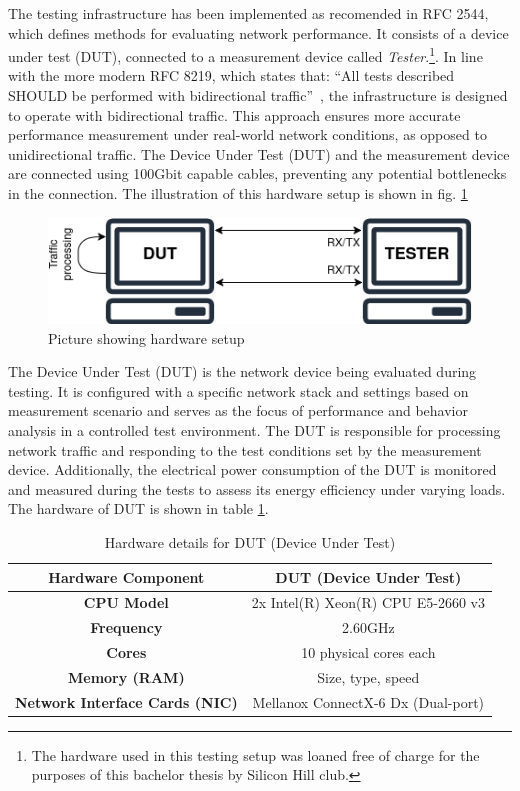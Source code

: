 The testing infrastructure has been implemented as recomended in RFC 2544, which defines methods for evaluating network performance. 
It consists of a device under test (DUT), connected to a measurement device called \textit{Tester}.\footnote{The hardware used in this testing setup was loaned free of charge for the purposes of this bachelor thesis by Silicon Hill club.}.
In line with the more modern RFC 8219, which states that: ``All tests described SHOULD be performed with bidirectional traffic''~\cite{RFC8219}, the infrastructure is designed to operate with bidirectional traffic. 
This approach ensures more accurate performance measurement under real-world network conditions, as opposed to unidirectional traffic.
The Device Under Test (DUT) and the measurement device are connected using 100Gbit capable cables, preventing any potential bottlenecks in the connection.
The illustration of this hardware setup is shown in fig. \ref{fig:hardware-setup}

\begin{figure}[!htbp]
    \centering
    \includegraphics[width=0.9\linewidth]{images/setup.png}
    \caption{Picture showing hardware setup}
    \label{fig:hardware-setup}
\end{figure}

The Device Under Test (DUT) is the network device being evaluated during testing. 
It is configured with a specific network stack and settings based on measurement scenario 
and serves as the focus of performance and behavior analysis in a controlled test environment. 
The DUT is responsible for processing network traffic and responding to the test conditions set by the measurement device.
Additionally, the electrical power consumption of the DUT is monitored and measured during the tests to assess its energy efficiency under varying loads.
The hardware of DUT is shown in table \ref{tab:hardware_dut}.

\begin{table}[h!]
\centering
\begin{tabular}{|c|c|}
\hline
\textbf{Hardware Component} & \textbf{DUT (Device Under Test)} \\
\hline
\textbf{CPU Model} & 2x Intel(R) Xeon(R) CPU E5-2660 v3 \\
\hline
\textbf{Frequency} & 2.60GHz \\
\hline
\textbf{Cores} & 10 physical cores each \\
\hline
\textbf{Memory (RAM)} & Size, type, speed \\
\hline
\textbf{Network Interface Cards (NIC)} & Mellanox ConnectX-6 Dx (Dual-port) \\
\hline
\end{tabular}
\caption{Hardware details for DUT (Device Under Test)}
\label{tab:hardware_dut}
\end{table}

